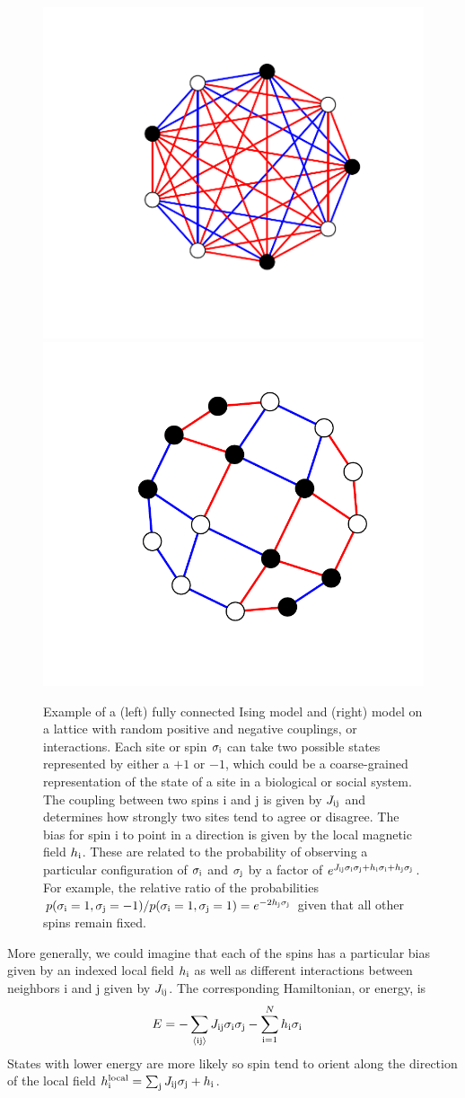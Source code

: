\documentclass[aps,prl,twocolumn]{revtex4-1}
\begin{document}
\begin{figure}[tb]\centering
	\includegraphics[width=.45\linewidth,clip,trim={100 70 70 60}]{images/ising_example}
	\includegraphics[width=.45\linewidth,clip,trim={60 50 50 45}]{images/ising_example_lattice}
\caption{Example of a (left) fully connected Ising model and (right) model on a lattice with random positive and negative couplings, or interactions. Each site or spin $\sigma_{\rm i}$ can take two possible states represented by either a $+1$ or $-1$, which could be a coarse-grained representation of the state of a site in a biological or social system. The coupling between two spins i and j is given by $J_{\rm ij}$ and determines how strongly two sites tend to agree or disagree.
The bias for spin i to point in a direction is given by the local magnetic field $h_{\rm i}$.
These are related to the probability of observing a particular configuration of $\sigma_{\rm i}$ and $\sigma_{\rm j}$ by a factor of $e^{J_{\rm ij}\sigma_{\rm i}\sigma_{\rm j} + h_{\rm i}\sigma_{\rm i} + h_{\rm j}\sigma_{\rm j}}$. For example, the relative ratio of the probabilities $p(\sigma_{\rm i}=1,\sigma_{\rm j}=-1)/p(\sigma_{\rm i}=1,\sigma_{\rm j}=1) = e^{-2h_{\rm j}\sigma_{\rm j}}$ given that all other spins remain fixed.}
\label{gr:ising}
\end{figure}

More generally, we could imagine that each of the spins has a particular bias given by an indexed local field $h_{\rm i}$ as well as different interactions between neighbors i and j given by $J_{\rm ij}$. The corresponding Hamiltonian, or energy, is
\begin{align}
	E &= -\sum_{\rm \left<ij\right>} J_{\rm ij}\sigma_{\rm i}\sigma_{\rm j} -\sum_{\rm i=1}^Nh_{\rm i}\sigma_{\rm i}
\end{align}
States with lower energy are more likely so spin tend to orient along the direction of the local field $h_{\rm i}^{\rm local} = \sum_{\rm j}J_{\rm ij}\sigma_{\rm j} +h_{\rm i}$. 
\end{document}
